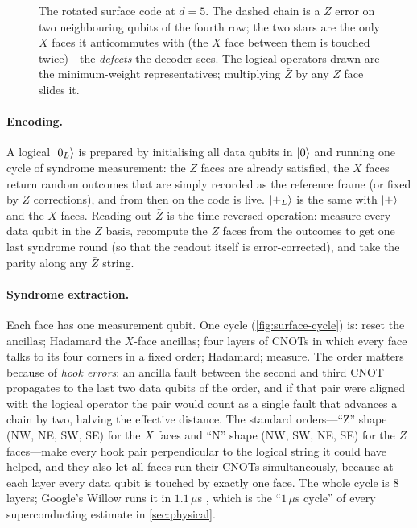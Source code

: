 \begin{figure}[H]
\caption{The rotated surface code at $d=5$. The dashed chain is a $Z$ error on two neighbouring qubits of the fourth row; the two stars are the only $X$ faces it anticommutes with (the $X$ face between them is touched twice)---the \emph{defects} the decoder sees. The logical operators drawn are the minimum-weight representatives; multiplying $\bar Z$ by any $Z$ face slides it.}
\label{fig:surface-lattice}
\end{figure}

\paragraph{Encoding.} A logical $\lvert 0_L \rangle$ is prepared by initialising all data qubits in $\lvert 0 \rangle$ and running one cycle of syndrome measurement: the $Z$ faces are already satisfied, the $X$ faces return random outcomes that are simply recorded as the reference frame (or fixed by $Z$ corrections), and from then on the code is live. $\lvert +_L \rangle$ is the same with $\lvert + \rangle$ and the $X$ faces. Reading out $\bar Z$ is the time-reversed operation: measure every data qubit in the $Z$ basis, recompute the $Z$ faces from the outcomes to get one last syndrome round (so that the readout itself is error-corrected), and take the parity along any $\bar Z$ string.

\paragraph{Syndrome extraction.} Each face has one measurement qubit. One cycle (\cref{fig:surface-cycle}) is: reset the ancillas; Hadamard the $X$-face ancillas; four layers of CNOTs in which every face talks to its four corners in a fixed order; Hadamard; measure. The order matters because of \emph{hook errors}: an ancilla fault between the second and third CNOT propagates to the last two data qubits of the order, and if that pair were aligned with the logical operator the pair would count as a single fault that advances a chain by two, halving the effective distance. The standard orders---``Z'' shape (NW, NE, SW, SE) for the $X$ faces and ``N'' shape (NW, SW, NE, SE) for the $Z$ faces---make every hook pair perpendicular to the logical string it could have helped, and they also let all faces run their CNOTs simultaneously, because at each layer every data qubit is touched by exactly one face. The whole cycle is $8$ layers; Google's Willow runs it in $1.1\,\mu$s \cite{willow25}, which is the ``$1\,\mu$s cycle'' of every superconducting estimate in \cref{sec:physical}.

